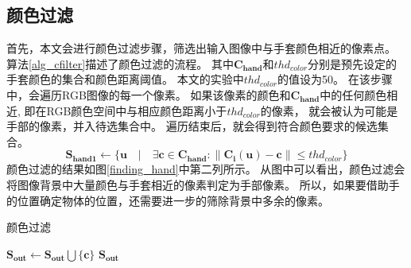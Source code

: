\subsection{颜色过滤}
首先，本文会进行颜色过滤步骤，筛选出输入图像中与手套颜色相近的像素点。
算法\ref{alg_cfilter}描述了颜色过滤的流程。
其中$\bm{C_{hand}}$和$thd_{color}$分别是预先设定的手套颜色的集合和颜色距离阈值。
本文的实验中$thd_{color}$的值设为50。
在该步骤中，会遍历RGB图像的每一个像素。
如果该像素的颜色和$\bm{C_{hand}}$中的任何颜色相近,
即在RGB颜色空间中与相应颜色距离小于$thd_{color}$的像素，
就会被认为可能是手部的像素，并入待选集合中。
遍历结束后，就会得到符合颜色要求的候选集合。
\begin{equation}
    \bm{S_{hand1}} \gets
    \{
    \bm{u} \quad
    | \quad
    \exists \bm{c} \in \bm{C_{hand}} :
    \| \bm{C_i}(\bm{u}) - \bm{c}\| \leq thd_{color}
    \}
\end{equation}
颜色过滤的结果如图\ref{finding_hand}中第二列所示。
从图中可以看出，颜色过滤会将图像背景中大量颜色与手套相近的像素判定为手部像素。
所以，如果要借助手的位置确定物体的位置，还需要进一步的筛除背景中多余的像素。
\begin{algorithm}
    \caption{颜色过滤}
    \label{alg_cfilter}
    \begin{algorithmic}[1]
                    \State $\bm{S_{out}} \gets \bm{S_{out}} \bigcup \{\bm{c}\}$
                    \EndIf
                \EndFor
            \EndFor 
            \State \Return $\bm{S_{out}}$
        \EndFunction
    \end{algorithmic}
\end{algorithm}
